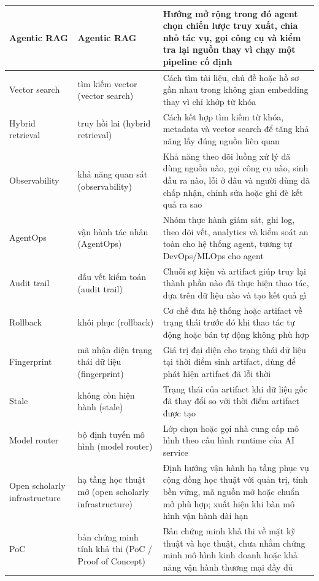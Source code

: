\begin{longtable}{|C{0.16\textwidth}|P{0.22\textwidth}|P{0.55\textwidth}|}
  Agentic RAG     &     Agentic RAG     &     Hướng mở rộng trong đó agent chọn chiến lược truy xuất, chia nhỏ tác vụ, gọi công cụ và kiểm tra lại nguồn thay vì chạy một pipeline cố định \\ \hline
  Vector search      &      tìm kiếm vector (vector search)      &      Cách tìm tài liệu, chủ đề hoặc hồ sơ gần nhau trong không gian embedding thay vì chỉ khớp từ khóa \\ \hline
  Hybrid retrieval     &     truy hồi lai (hybrid retrieval)     &     Cách kết hợp tìm kiếm từ khóa, metadata và vector search để tăng khả năng lấy đúng nguồn liên quan \\ \hline
  Observability      &      khả năng quan sát (observability)      &      Khả năng theo dõi luồng xử lý đã dùng nguồn nào, gọi công cụ nào, sinh đầu ra nào, lỗi ở đâu và người dùng đã chấp nhận, chỉnh sửa hoặc ghi đè kết quả ra sao \\ \hline
  AgentOps     &     vận hành tác nhân (AgentOps)     &     Nhóm thực hành giám sát, ghi log, theo dõi vết, analytics và kiểm soát an toàn cho hệ thống agent, tương tự DevOps/MLOps cho agent \\ \hline
  Audit trail      &      dấu vết kiểm toán (audit trail)      &      Chuỗi sự kiện và artifact giúp truy lại thành phần nào đã thực hiện thao tác, dựa trên dữ liệu nào và tạo kết quả gì \\ \hline
  Rollback      &      khôi phục (rollback)      &      Cơ chế đưa hệ thống hoặc artifact về trạng thái trước đó khi thao tác tự động hoặc bán tự động không phù hợp \\ \hline
  Fingerprint     &     mã nhận diện trạng thái dữ liệu (fingerprint)     &     Giá trị đại diện cho trạng thái dữ liệu tại thời điểm sinh artifact, dùng để phát hiện artifact đã lỗi thời \\ \hline
  Stale      &      không còn hiện hành (stale)      &      Trạng thái của artifact khi dữ liệu gốc đã thay đổi so với thời điểm artifact được tạo \\ \hline
  Model router     &     bộ định tuyến mô hình (model router)     &     Lớp chọn hoặc gọi nhà cung cấp mô hình theo cấu hình runtime của AI service \\ \hline
  Open scholarly infrastructure      &      hạ tầng học thuật mở (open scholarly infrastructure)      &      Định hướng vận hành hạ tầng phục vụ cộng đồng học thuật với quản trị, tính bền vững, mã nguồn mở hoặc chuẩn mở phù hợp; xuất hiện khi bàn mô hình vận hành dài hạn \\ \hline
  PoC     &     bản chứng minh tính khả thi (PoC / Proof of Concept)     &     Bản chứng minh khả thi về mặt kỹ thuật và học thuật, chưa nhằm chứng minh mô hình kinh doanh hoặc khả năng vận hành thương mại đầy đủ \\ \hline
\end{longtable}
\endgroup

